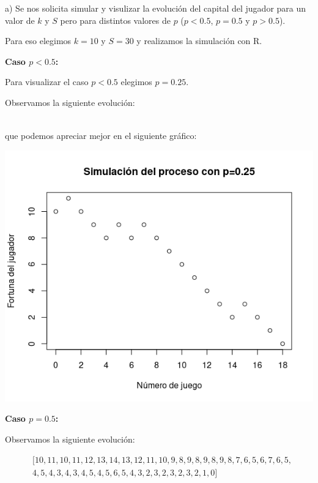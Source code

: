 \documentclass[11pt]{article}
\begin{document}
a) Se nos solicita simular y visulizar la evolución del capital del jugador para un valor de $k$ y $S$ pero para distintos
valores de $p$ ($p < 0.5$, $p=0.5$ y $p> 0.5$).

Para eso elegimos $k=10$ y $S=30$ y realizamos la simulación con R.

\textbf{Caso $p < 0.5$:}

Para visualizar el caso $p < 0.5$ elegimos $p=0.25$. 

Observamos la siguiente evolución: 

\vspace{-1cm}

\begin{align*}
    [10, 11, 10, 9, 8, 9, 8, 9, 8, 7, 6, 5, 4, 3, 2, 3, 2, 1, 0]
\end{align*}

\vspace{-0.5cm}

que podemos apreciar mejor en el siguiente gráfico: 

\begin{center}\includegraphics[scale = 0.51]{P3Sim1.png}\end{center}

\vspace{-0.25cm}

\textbf{Caso $p=0.5$:}

Observamos la siguiente evolución: 

\vspace{-1cm}

\begin{align*}
    &[10, 11, 10, 11, 12, 13, 14, 13, 12, 11, 10, 9, 8, 9, 8, 9, 8, 9, 8, 7, 6, 5, 6, 7, 6, 5, \\ 
    & 4, 5, 4, 3, 4, 3, 4, 5, 4, 5, 6, 5, 4, 3, 2, 3, 2, 3, 2, 3, 2, 1, 0]
\end{align*}
\end{document}
